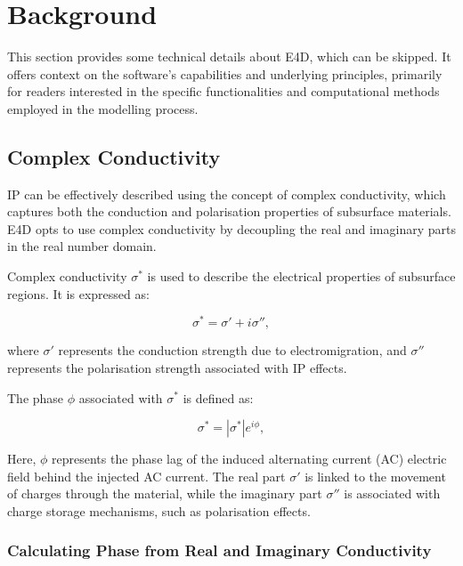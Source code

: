 \documentclass[a4paper,12pt]{article}
\begin{document}
\newpage

\section{Background}

This section provides some technical details about E4D, which can be skipped.
It offers context on the software’s capabilities and underlying principles,
primarily for readers interested in the specific functionalities and
computational methods employed in the modelling process.

\subsection{Complex Conductivity}

IP can be effectively described using the concept of complex conductivity,
which captures both the conduction and polarisation properties of subsurface
materials. E4D opts to use complex conductivity by decoupling the real and
imaginary parts in the real number domain.

Complex conductivity \( \sigma^* \) is used to describe the electrical
properties of subsurface regions. It is expressed as:

\begin{equation}
    \sigma^* = \sigma' + i\sigma'',
\end{equation}

where \( \sigma' \) represents the conduction strength due to electromigration,
and \( \sigma'' \) represents the polarisation strength associated with IP
effects.

The phase \( \phi \) associated with \( \sigma^* \) is defined as:

\begin{equation}
    \sigma^* = |\sigma^*| e^{i\phi},
\end{equation}

Here, \( \phi \) represents the phase lag of the induced alternating current
(AC) electric field behind the injected AC current. The real part \( \sigma' \)
is linked to the movement of charges through the material, while the imaginary
part \( \sigma'' \) is associated with charge storage mechanisms, such as
polarisation effects.

\subsubsection{Calculating Phase from Real and Imaginary Conductivity}
\end{document}
